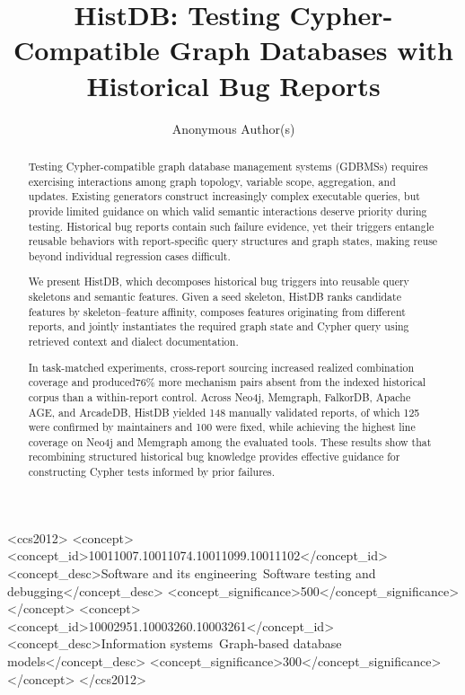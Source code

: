 \documentclass[acmsmall,screen,anonymous]{acmart}
\begin{document}
\title{HistDB: Testing Cypher-Compatible Graph Databases with Historical Bug Reports}
\author{Anonymous Author(s)}

\begin{abstract}
Testing Cypher-compatible graph database management systems (GDBMSs) requires exercising interactions among graph topology, variable scope, aggregation, and updates. Existing generators construct increasingly complex executable queries, but provide limited guidance on which valid semantic interactions deserve priority during testing. Historical bug reports contain such failure evidence, yet their triggers entangle reusable behaviors with report-specific query structures and graph states, making reuse beyond individual regression cases difficult.

We present HistDB, which decomposes historical bug triggers into reusable query skeletons and semantic features. Given a seed skeleton, HistDB ranks candidate features by skeleton--feature affinity, composes features originating from different reports, and jointly instantiates the required graph state and Cypher query using retrieved context and dialect documentation.

In task-matched experiments, cross-report sourcing increased realized combination coverage and produced76\% more mechanism pairs absent from the indexed historical corpus than a within-report control. Across Neo4j, Memgraph, FalkorDB, Apache AGE, and ArcadeDB, HistDB yielded 148 manually validated reports, of which 125 were confirmed by maintainers and 100 were fixed, while achieving the highest line coverage on Neo4j and Memgraph among the evaluated tools. These results show that recombining structured historical bug knowledge provides effective guidance for constructing Cypher tests informed by prior failures.
\end{abstract}

\begin{CCSXML}
<ccs2012>
 <concept>
  <concept_id>10011007.10011074.10011099.10011102</concept_id>
  <concept_desc>Software and its engineering~Software testing and debugging</concept_desc>
  <concept_significance>500</concept_significance>
 </concept>
 <concept>
  <concept_id>10002951.10003260.10003261</concept_id>
  <concept_desc>Information systems~Graph-based database models</concept_desc>
  <concept_significance>300</concept_significance>
 </concept>
</ccs2012>
\end{CCSXML}
\end{document}
